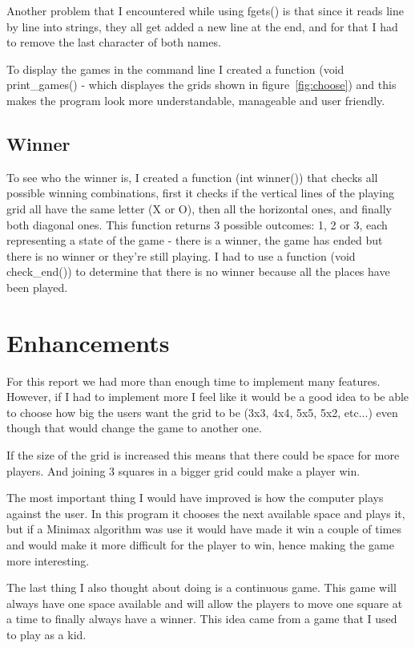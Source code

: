 \documentclass[10pt, a4paper]{article}
\begin{document}
Another problem that I encountered while using fgets() is that since it reads line by line into strings, they all get added a new line at the end, and for that I had to remove the last character of both names.

To display the games in the command line I created a function (void print\_games() - which displayes the grids shown in figure~\ref{fig:choose}) and this makes the program look more understandable, manageable and user friendly.

    \subsection{Winner}

To see who the winner is, I created a function (int winner()) that checks all possible winning combinations, first it checks if the vertical lines of the playing grid all have the same letter (X or O), then all the horizontal ones, and finally both diagonal ones. This function returns 3 possible outcomes: 1, 2 or 3, each representing a state of the game - there is a winner, the game has ended but there is no winner or they're still playing. I had to use a function (void check\_end()) to determine that there is no winner because all the places have been played.

	\section{Enhancements}

For this report we had more than enough time to implement many features. However, if I had to implement more I feel like it would be a good idea to be able to choose how big the users want the grid to be (3x3, 4x4, 5x5, 5x2, etc...) even though that would change the game to another one.

If the size of the grid is increased this means that there could be space for more players. And joining 3 squares in a bigger grid could make a player win.

The most important thing I would have improved is how the computer plays against the user. In this program it chooses the next available space and plays it, but if a Minimax algorithm was use it would have made it win a couple of times and would make it more difficult for the player to win, hence making the game more interesting.

The last thing I also thought about doing is a continuous game. This game will always have one space available and will allow the players to move one square at a time to finally always have a winner. This idea came from a game that I used to play as a kid.
\end{document}
